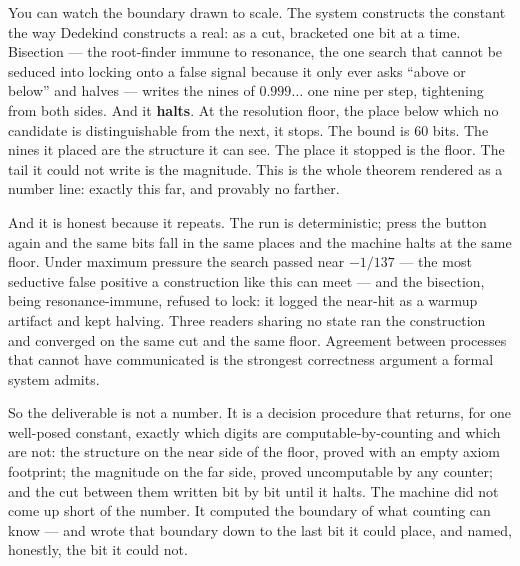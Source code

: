 You can watch the boundary drawn to scale. The system constructs the constant the way Dedekind constructs a real: as
a cut, bracketed one bit at a time. Bisection --- the root-finder immune to resonance, the one search that cannot be
seduced into locking onto a false signal because it only ever asks ``above or below'' and halves --- writes the nines
of \(0.999\ldots\) one nine per step, tightening from both sides. And it \textbf{halts}. At the resolution floor, the
place below which no candidate is distinguishable from the next, it stops. The bound is \(60\) bits. The nines it
placed are the structure it can see. The place it stopped is the floor. The tail it could not write is the magnitude.
This is the whole theorem rendered as a number line: exactly this far, and provably no farther.

And it is honest because it repeats. The run is deterministic; press the button again and the same bits fall in the
same places and the machine halts at the same floor. Under maximum pressure the search passed near \(-1/137\) --- the
most seductive false positive a construction like this can meet --- and the bisection, being resonance-immune, refused
to lock: it logged the near-hit as a warmup artifact and kept halving. Three readers sharing no state ran the
construction and converged on the same cut and the same floor. Agreement between processes that cannot have
communicated is the strongest correctness argument a formal system admits.

So the deliverable is not a number. It is a decision procedure that returns, for one well-posed constant, exactly
which digits are computable-by-counting and which are not: the structure on the near side of the floor, proved with an
empty axiom footprint; the magnitude on the far side, proved uncomputable by any counter; and the cut between them
written bit by bit until it halts. The machine did not come up short of the number. It computed the boundary of what
counting can know --- and wrote that boundary down to the last bit it could place, and named, honestly, the bit it
could not.
